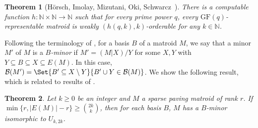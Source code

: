 \documentclass{article}
\newtheorem{theorem}{Theorem}[section]
\theoremstyle{definition}
\newcommand{\GF}{\mathrm{GF}}
\newcommand{\N}{\mathbb{N}}
\begin{document}
\begin{theorem}[Hörsch, Imolay, Mizutani, Oki, Schwarcz~\cite{horsch2024problems}] \label{thm:weakly}
    There is a computable function $h\colon \N\times \N \to \N$ such that for every prime power $q$, every $\GF(q)$-representable matroid is weakly $(h(q,k),k)$-orderable for any $k \in \N$.
\end{theorem}

Following the terminology of \cite{horsch2024problems}, for a basis $B$ of a matroid $M$, we say that a minor $M'$ of $M$ is a \textit{$B$-minor} if $M' = (M|X)/Y$ for some $X, Y$ with $Y \subseteq B \subseteq X \subseteq E(M)$.
In this case, $\mathcal{B}(M') = \Set{B' \subseteq X \setminus Y}{B' \cup Y \in \mathcal{B}(M)}$. We show the following result, which is related to results of \cite{pendavingh2018number}.

\begin{theorem}
\label{thm:uniform_minors}
    Let $k\ge 0$ be an integer and $M$ a sparse paving matroid of rank $r$. If $\min\{r, |E(M)|-r\} \ge \binom{2k}{k}$, then for each basis $B$, $M$ has a $B$-minor isomorphic to $U_{k, 2k}$.
\end{theorem}
\end{document}
